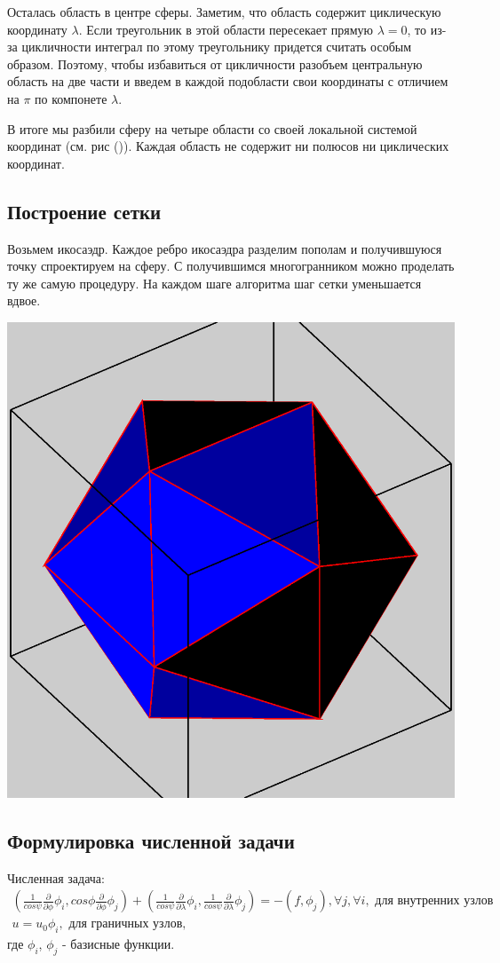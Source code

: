 \documentclass[a4paper,article]{article}
\begin{document}
Осталась область в центре сферы. Заметим, что область содержит
циклическую координату $\lambda$. Если треугольник в этой области
пересекает прямую $\lambda=0$, то из-за цикличности интеграл по этому
треугольнику придется считать особым образом. Поэтому, чтобы
избавиться от цикличности разобъем центральную область на две части и
введем в каждой подобласти свои координаты с отличием на $\pi$ по
компонете $\lambda$.

В итоге мы разбили сферу на четыре области со своей локальной системой
координат (см. рис ()). Каждая область не содержит ни полюсов ни
циклических координат. 

\subsection{Построение сетки}
Возьмем икосаэдр. Каждое ребро икосаэдра разделим пополам и
получившуюся точку спроектируем на сферу. С получившимся
многогранником можно проделать ту же самую процедуру. На каждом шаге
алгоритма шаг сетки уменьшается вдвое. 

\includegraphics[scale=0.5]{icosahedron.eps}

\subsection{Формулировка численной задачи}
Численная задача:
\begin{equation*}
\begin{split}
(\frac{1}{cos\psi}\frac{\partial}{\partial \phi} \phi_i, cos\phi
  \frac{\partial}{\partial \phi} \phi_j) 
+(\frac{1}{cos\psi}\frac{\partial}{\partial \lambda}\phi_i,
\frac{1}{cos\psi}\frac{\partial}{\partial \lambda}\phi_j ) = -(f,
\phi_j), \forall j, \forall i, \text{ для внутренних узлов } \\ 
u = u_0 \phi_i, \text { для граничных узлов, }
\end{split}
\end{equation*}
где $\phi_i$, $\phi_j$ - базисные функции.
\end{document}
